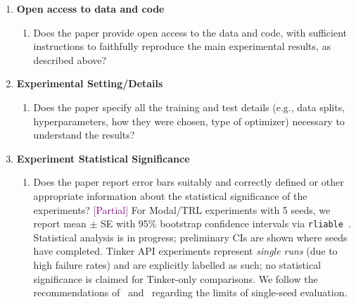\documentclass{article}
\newcommand{\answerPartial}[1][]{\textcolor{purple}{[Partial] #1}}
\begin{document}
\begin{enumerate}
\item {\bf Open access to data and code}
    \begin{enumerate}
        \item Does the paper provide open access to the data and code, with
              sufficient instructions to faithfully reproduce the main
              experimental results, as described above?
    \end{enumerate}

\item {\bf Experimental Setting/Details}
    \begin{enumerate}
        \item Does the paper specify all the training and test details
              (e.g., data splits, hyperparameters, how they were chosen,
              type of optimizer) necessary to understand the results?
    \end{enumerate}

\item {\bf Experiment Statistical Significance}
    \begin{enumerate}
        \item Does the paper report error bars suitably and correctly
              defined or other appropriate information about the statistical
              significance of the experiments?
        \answerPartial{For Modal/TRL experiments with 5 seeds, we report
        mean $\pm$ SE with 95\% bootstrap confidence intervals via
        \texttt{rliable}~\cite{agarwal2021deep}.  Statistical analysis is
        in progress; preliminary CIs are shown where seeds have completed.
        Tinker API experiments represent \emph{single runs} (due to high
        failure rates) and are explicitly labelled as such; no statistical
        significance is claimed for Tinker-only comparisons.  We follow the
        recommendations of~\citet{colas2019hitchhiker}
        and~\citet{jordan2024benchmarking} regarding the limits of
        single-seed evaluation.}
    \end{enumerate}


\end{enumerate}
\end{document}
